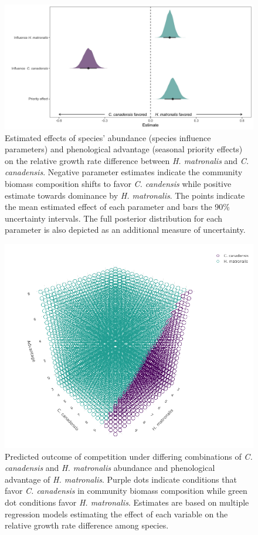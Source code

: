 \documentclass{article}[11pt]
\begin{document}
\begin{figure}[h!]
    \centering
\includegraphics[width=\textwidth]{..//figure/mu_plots.jpeg}
    \caption{Estimated effects of species' abundance (species influence parameters) and phenological advantage (seasonal priority effects) on the relative growth rate difference between \textit{H. matronalis} and \textit{C. canadensis}. Negative parameter estimates indicate the community biomass composition shifts to favor \textit{C. candensis} while positive estimate towards dominance by \textit{ H. matronalis}. The points indicate the mean estimated effect of each parameter and bars the 90\% uncertainty intervals. The full posterior distribution for each parameter is also depicted as an additional measure of uncertainty.} 
    \label{fig:RGRD}
\end{figure}

\begin{figure}[h!]
    \centering
\includegraphics[width=\textwidth]{..//figure/3dconnolly2.png}
   \caption{Predicted outcome of competition under differing combinations of \textit{C. canadensis} and \textit{H. matronalis} abundance and phenological advantage of \textit{H. matronalis}. Purple dots indicate conditions that favor  \textit{C. canadensis} in community biomass composition while green dot conditions favor \textit{H. matronalis}. Estimates are based on multiple regression models estimating the effect of each variable on the relative growth rate difference among species.} 
   \label{fig:3D}
\end{figure}
\end{document}

